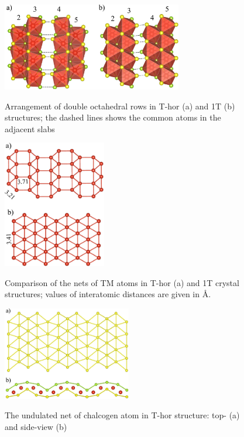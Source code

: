 \documentclass[a4paperm]{article}
\begin{document}
\begin{figure}[H]
	\includegraphics[width=0.7\textwidth]{T_hor_slabs.png} \\
	\caption{Arrangement of double octahedral rows in T-hor (a) and 1T (b) structures; the dashed lines shows the common atoms in the adjacent slabs}
	\label{T_hor_slabs}
\end{figure}


\begin{figure}[H]
	\includegraphics[width=0.4\textwidth]{T_hor_V.png} \\
	\caption{Comparison of the nets of TM atoms in T-hor (a) and 1T crystal structures; values of interatomic distances are given in \AA.}
	\label{T_hor_V}
\end{figure}

\begin{figure}[H]
        \includegraphics[width=0.5\textwidth]{T_hor_hcb.png} \\
        \caption{The undulated net of chalcogen atom in T-hor structure: top- (a) and side-view (b)}
\label{T_hor_hcb}
\end{figure}
\end{document}
